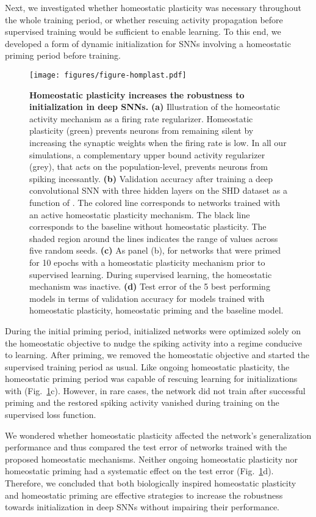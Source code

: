 \documentclass[11pt,a4paper]{article}
\begin{document}
Next, we investigated whether homeostatic plasticity was necessary throughout the whole training period, or whether rescuing activity propagation before supervised training would be sufficient to enable learning. 
To this end, we developed a form of dynamic initialization for \acp{SNN} involving a homeostatic priming period before training. 
\begin{figure}[tb]
    \centering
    \texttt{[image: figures/figure-homplast.pdf]}
    \caption{\textbf{Homeostatic plasticity increases the robustness to initialization in deep \acp{SNN}.} 
    \textbf{(a)} Illustration of the homeostatic activity mechanism as a firing rate regularizer. Homeostatic plasticity (green) prevents neurons from remaining silent by increasing the synaptic weights when the firing rate is low. In all our simulations, a complementary upper bound activity regularizer (grey), that acts on the population-level, prevents neurons from spiking incessantly. 
    \textbf{(b)} Validation accuracy after training a deep convolutional \ac{SNN} with three hidden layers on the \ac{SHD} dataset as a function of . The colored line corresponds to networks trained with an active homeostatic plasticity mechanism. The black line corresponds to the baseline  without homeostatic plasticity. The shaded region around the lines indicates the range of values across five random seeds. 
    \textbf{(c)} As panel (b), for networks that were primed for 10 epochs with a homeostatic plasticity mechanism prior to supervised learning. During supervised learning, the homeostatic mechanism was inactive.
    \textbf{(d)} Test error of the 5 best performing models in terms of validation accuracy for models trained with homeostatic plasticity, homeostatic priming and the baseline model. 
    }
    \label{fig:homplast}
\end{figure}
During the initial priming period, initialized networks were optimized solely on the homeostatic objective to nudge the spiking activity into a regime conducive to learning. 
After priming, we removed the homeostatic objective and started the supervised training period as usual.
Like ongoing homeostatic plasticity, the homeostatic priming period was capable
of rescuing learning for initializations with  (Fig.~\ref{fig:homplast}c).
However, in rare cases, the network did not train after successful priming and the restored spiking activity vanished during training on the supervised loss function.

We wondered whether homeostatic plasticity affected the network's generalization performance and thus compared the test error of networks trained with the proposed homeostatic mechanisms.
Neither ongoing homeostatic plasticity nor homeostatic priming had a systematic effect on the test error (Fig.~\ref{fig:homplast}d). 
Therefore, we concluded that both biologically inspired homeostatic plasticity and homeostatic priming are effective strategies to increase the robustness towards initialization in deep \acp{SNN} without impairing their performance.
\end{document}
